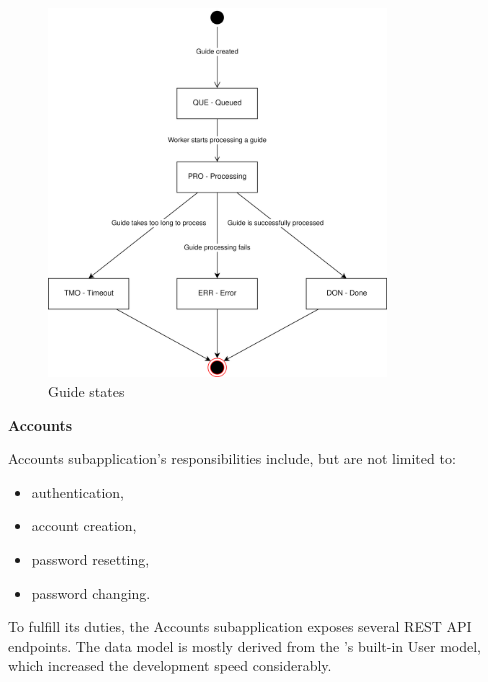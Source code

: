 \begin{figure}[H]
  \caption{Guide states}
  \centering
    \includegraphics[width=0.8\textwidth]{assets/3-guide-states.png}
\end{figure}


\medskip

\textbf{Accounts}

Accounts subapplication's responsibilities include, but are not limited to:
\begin{itemize}
	\item authentication,
	\item account creation,
	\item password resetting,
	\item password changing.
\end{itemize}

To fulfill its duties, the Accounts subapplication exposes several REST API endpoints.
The data model is mostly derived from the 's built-in User model, which increased the development speed considerably.
\medskip

